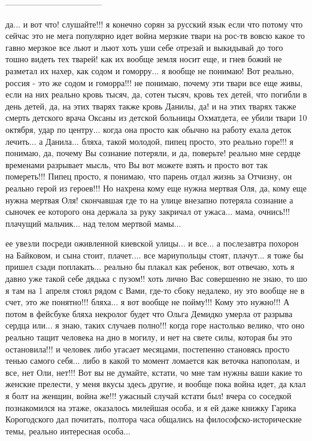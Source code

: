 -----------------------------------

да... и вот что! слушайте!!! я конечно сорян за русский язык если что потому
что сейчас это не мега популярно идет война мерзкие твари на рос-тв вовсю какое
то гавно мерзкое все льют и льют хоть уши себе отрезай и выкидывай до того
тошно видеть тех тварей! как их вообще земля носит еще, и гнев божий не
разметал их нахер, как содом и гоморру... я вообще не понимаю! Вот реально, россия - это же содом и гоморра!!! 
не понимаю, почему эти твари все еще
живы, если на них реально кровь тысяч, да, сотен тысяч, кровь тех детей, что
погибли в день детей, да, на этих тварях также кровь Данилы, да! и на этих
тварях также смерть детского врача Оксаны из детской больницы Охматдета, ее убили
твари 10 октября, удар по центру... когда она просто как обычно на работу ехала деток лечить...
а Данила... бляха, такой молодой, пипец просто, это реально горе!!! я понимаю,
да, почему Вы сознание потеряли, и да, поверьте!  реально мне сердце временами
разрывает мысль, что Вы вот можете взять и просто вот так помереть!!! Пипец
просто, я понимаю, что парень отдал жизнь за Отчизну, он реально герой из
героев!!! Но нахрена кому еще нужна мертвая Оля, да, кому еще нужна мертвая
Оля!  скончавшая где то на улице внезапно потеряла сознание а сыночек ее
которого она держала за руку закричал от ужаса... мама, очнись!!! плачущий
мальчик...  над телом мертвой мамы...  

ее увезли посреди оживленной киевской
улицы...  и все...  а послезавтра похорон на Байковом, и сына стоит, плачет....
все мариупольцы стоят, плачут...  я тоже бы пришел сзади поплакать... реально
бы плакал как ребенок, вот отвечаю, хоть я давно уже такой себе дядька с
пузом!!  хоть лично Вас совершенно не знаю, то шо я там на 1 апреля стоял рядом
с Вами, где-то сбоку недалеко, ну это вообще не в счет, это же понятно!!!
бляха... я вот вообще не пойму!!! Кому это нужно!!!  А потом в фейсбуке бляха
некролог будет что Ольга Демидко умерла от разрыва сердца или...  я знаю, таких
случаев полно!!!  когда горе настолько велико, что оно реально тащит человека
на дно в могилу, и нет на свете силы, которая бы это
остановила!!! и человек либо угасает месяцами, постепенно становясь просто
тенью самого себя...  либо в какой то момент ломается как веточка напополам, и
все, нет Оли, нет!!!  Вот вы не думайте, кстати, чо мне там нужны ваши какие то
женские прелести, у меня вкусы здесь другие, и вообще пока война идет, да клал
я болт на женщин, война же!!! ужасный случай кстати был! вчера со соседкой
познакомился на этаже, оказалось милейшая особа, и я ей даже книжку Гарика
Корогодского дал почитать, полтора часа общались на философско-исторические темы, 
реально интересная особа... 

